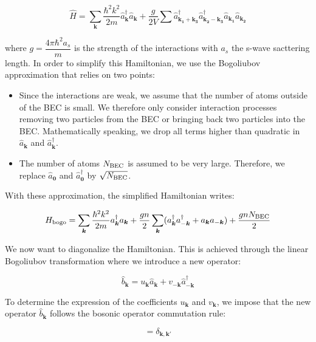 \begin{equation}
    \hat{H}=\sum_{\bm{k}}\frac{\hbar^2 k^2}{2m} \hat{a}^{\dagger}_{\bm{k}}  \hat{a}_{\bm{k}} +  \frac{g}{2V} \sum \hat{a}^{\dagger}_{\bm{k_1}+\bm{k_3}} \hat{a}^{\dagger}_{\bm{k_2}-\bm{k_3}} \hat{a}_{\bm{k_1}} \hat{a}_{\bm{k_2}} 
\end{equation}

\noindent where $g=\dfrac{4 \pi \hbar^2 a_s}{m}$ is the strength of the interactions with $a_s$ the s-wave sacttering length.  In order to simplify this Hamiltonian, we use the Bogoliubov approximation that relies on two points:

\begin{itemize}
    \item Since the interactions are weak, we assume that the number of atoms outside of the BEC is small. We therefore only consider interaction processes removing two particles from the BEC or bringing back two particles into the BEC. Mathematically speaking, we drop all terms higher than quadratic in $\hat{a}_{\bm{k}}$ and $\hat{a}^{\dagger}_{\bm{k}}$.
    \item The number of atoms $N_{\rm{BEC}}$ is assumed to be very large. Therefore, we replace $\hat{a}_{\bm{0}}$ and $\hat{a}^{\dagger}_{\bm{0}}$ by $\sqrt{N_{\rm{BEC}}}$. 
\end{itemize}

With these approximation, the simplified Hamiltonian writes:

\begin{equation}
    H_{\rm{bogo}}=\sum_{\bm{k}}\frac{\hbar^2 k^2}{2m} a^{\dagger}_{\bm{k}}  a_{\bm{k}} +  \frac{gn}{2} \sum_{\bm{k}} (a^{\dagger}_{\bm{k}} a^{\dagger}_{-\bm{k}} +a_{\bm{k}} a_{-\bm{k}})+\frac{gnN_{\rm{BEC}}}{2}
\end{equation}

We now want to diagonalize the Hamiltonian. This is achieved through the linear Bogoliubov transformation where we introduce a new operator:

\begin{equation}
    \hat{b}_{\bm{k}}=u_{\bm{k}} \hat{a}_{\bm{k}} + v_{-\bm{k}} \hat{a}^{\dagger}_{-\bm{k}}
\end{equation}

To determine the expression of the coefficients $u_{\bm{k}}$ and $v_{\bm{k}}$, we impose that the new operator $\hat{b}_{\bm{k}}$ follows the bosonic operator commutation rule:

\begin{equation}
    [\hat{b}_{\bm{k}},\hat{b}^{\dagger}_{\bm{k}'}]= \delta_{\bm{k},\bm{k}'}
\end{equation}

